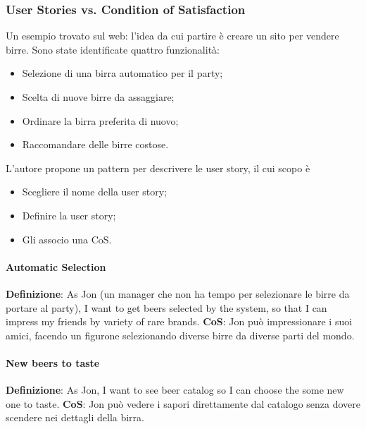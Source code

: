 \subsubsection{User Stories vs. Condition of Satisfaction}
Un esempio trovato sul web: l'idea da cui partire è creare un sito per vendere birre. Sono state identificate quattro funzionalità:
\begin{itemize}
	\item Selezione di una birra automatico per il party;
	\item Scelta di nuove birre da assaggiare;
	\item Ordinare la birra preferita di nuovo;
	\item Raccomandare delle birre costose.
\end{itemize}
L'autore propone un pattern per descrivere le user story, il cui scopo è
\begin{itemize}
	\item Scegliere il nome della user story;
	\item Definire la user story;
	\item Gli associo una CoS.
\end{itemize}

\paragraph{Automatic Selection}
\textbf{Definizione}: As Jon (un manager che non ha tempo per selezionare le birre da portare al party), I want to get beers selected by the system, so that I can impress my friends by variety of rare brands.\newline
\textbf{CoS}: Jon può impressionare i suoi amici, facendo un figurone selezionando diverse birre da diverse parti del mondo.\newline

\paragraph{New beers to taste}
\textbf{Definizione}: As Jon, I want to see beer catalog so I can choose the some new one to taste.\newline
\textbf{CoS}: Jon può vedere i sapori direttamente dal catalogo senza dovere scendere nei dettagli della birra.\newline

